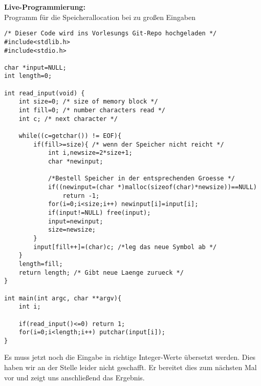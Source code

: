 \newpage
\textbf{Live-Programmierung:}\\
Programm für die Speicherallocation bei zu großen Eingaben
\begin{lstlisting}
/* Dieser Code wird ins Vorlesungs Git-Repo hochgeladen */
#include<stdlib.h>
#include<stdio.h>

char *input=NULL;
int length=0;

int read_input(void) {
    int size=0; /* size of memory block */
    int fill=0; /* number characters read */
    int c; /* next character */
    
    while((c=getchar()) != EOF){
        if(fill>=size){ /* wenn der Speicher nicht reicht */
            int i,newsize=2*size+1;
            char *newinput;
            
            /*Bestell Speicher in der entsprechenden Groesse */
            if((newinput=(char *)malloc(sizeof(char)*newsize))==NULL) 
                return -1;
            for(i=0;i<size;i++) newinput[i]=input[i];
            if(input!=NULL) free(input);
            input=newinput;
            size=newsize;
        }
        input[fill++]=(char)c; /*leg das neue Symbol ab */
    }
    length=fill;
    return length; /* Gibt neue Laenge zurueck */
}

int main(int argc, char **argv){
    int i;
    
    if(read_input()<=0) return 1;
    for(i=0;i<length;i++) putchar(input[i]);
}
\end{lstlisting}

Es muss jetzt noch die Eingabe in richtige Integer-Werte übersetzt werden. Dies haben wir an der Stelle leider nicht geschafft. Er bereitet dies zum nächsten Mal vor und zeigt uns anschließend das Ergebnis.